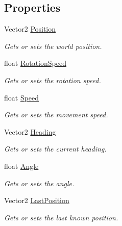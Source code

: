 \subsection*{Properties}
\begin{DoxyCompactItemize}
\item 
Vector2 \hyperlink{class_midnight_blue_1_1_engine_1_1_entity_component_1_1_movement_ab48a6634fc6983d0d36fe8c17654ee4b}{Position}
\begin{DoxyCompactList}\small\item\em Gets or sets the world position. \end{DoxyCompactList}\item 
float \hyperlink{class_midnight_blue_1_1_engine_1_1_entity_component_1_1_movement_a7fd77249681b1f63114597ee712a2b16}{Rotation\+Speed}
\begin{DoxyCompactList}\small\item\em Gets or sets the rotation speed. \end{DoxyCompactList}\item 
float \hyperlink{class_midnight_blue_1_1_engine_1_1_entity_component_1_1_movement_a6cbccdbe07f377faf4c4afa2f9821a76}{Speed}
\begin{DoxyCompactList}\small\item\em Gets or sets the movement speed. \end{DoxyCompactList}\item 
Vector2 \hyperlink{class_midnight_blue_1_1_engine_1_1_entity_component_1_1_movement_a61bee5da88e34141dbee5b105711367f}{Heading}
\begin{DoxyCompactList}\small\item\em Gets or sets the current heading. \end{DoxyCompactList}\item 
float \hyperlink{class_midnight_blue_1_1_engine_1_1_entity_component_1_1_movement_af4db35a6662c9becc7d8a6f5a939954f}{Angle}
\begin{DoxyCompactList}\small\item\em Gets or sets the angle. \end{DoxyCompactList}\item 
Vector2 \hyperlink{class_midnight_blue_1_1_engine_1_1_entity_component_1_1_movement_aba9c089ad947199089bf7d37fa884581}{Last\+Position}
\begin{DoxyCompactList}\small\item\em Gets or sets the last known position. \end{DoxyCompactList}\end{DoxyCompactItemize}


